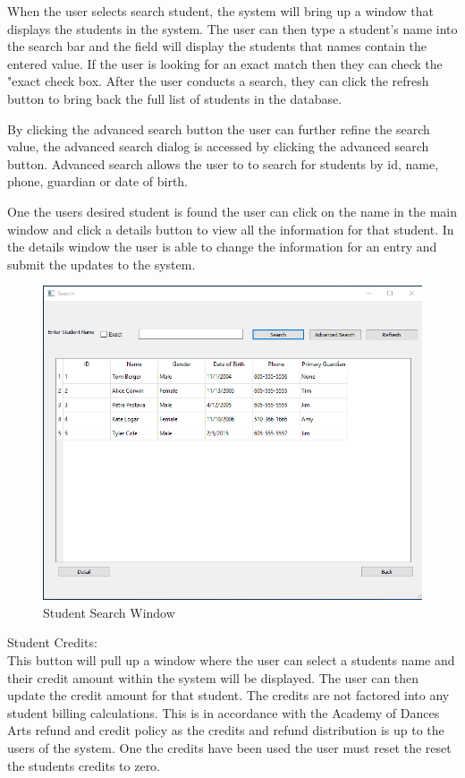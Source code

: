 When the user selects search student, the system will bring up a window that displays the students in the system. The user can then type a student's name into the search bar and the field will display the students that names contain the entered value. If the user is looking for an exact match then they can check the "exact check box. After the user conducts a search, they can click the refresh button to bring back the full list of students in the database.

By clicking the advanced search button the user can further refine the search value, the advanced search dialog is accessed by clicking the advanced search button. Advanced search allows the user to to search for students by id, name, phone, guardian or date of birth.

One the users desired student is found the user can click on the name in the main window and click a details button to view all the information for that student.  In the details window the user is able to change the information for an entry and submit the updates to the system.\\

\begin{figure}
  \includegraphics[width=\linewidth]{pics/userGuide/searchStudents.png}
  \caption{Student Search Window}
  \label{fig:User doc: Student Search}
\end{figure}


Student Credits:\\
This button will pull up a window where the user can select a students name and their credit amount within the system will be displayed. The user can then update the credit amount for that student. The credits are not factored into any student billing calculations. This is in accordance with the Academy of Dances Arts refund and credit policy as the credits and refund distribution is up to the users of the system. One the credits have been used the user must reset the reset the students credits to zero.\\

